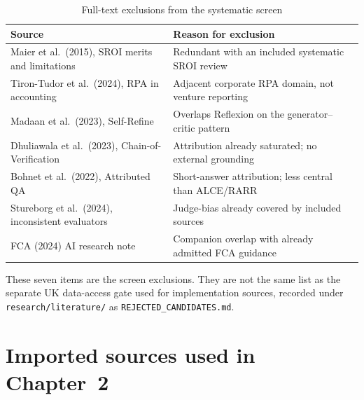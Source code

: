 \begin{table}[htbp]
  \centering
  \small
  \begin{tabularx}{\textwidth}{@{}P{0.46\textwidth}Y@{}}
    \toprule
    \textbf{Source} & \textbf{Reason for exclusion} \\
    \midrule
    Maier et al.\ (2015), SROI merits and limitations & Redundant with an included systematic SROI review \\
    Tiron-Tudor et al.\ (2024), RPA in accounting & Adjacent corporate RPA domain, not venture reporting \\
    Madaan et al.\ (2023), Self-Refine & Overlaps Reflexion on the generator--critic pattern \\
    Dhuliawala et al.\ (2023), Chain-of-Verification & Attribution already saturated; no external grounding \\
    Bohnet et al.\ (2022), Attributed QA & Short-answer attribution; less central than ALCE/RARR \\
    Stureborg et al.\ (2024), inconsistent evaluators & Judge-bias already covered by included sources \\
    FCA (2024) AI research note & Companion overlap with already admitted FCA guidance \\
    \bottomrule
  \end{tabularx}
  \caption{Full-text exclusions from the systematic screen}
  \label{tab:lit-screened-out}
\end{table}

These seven items are the screen exclusions. They are not the same list as the separate UK
data-access gate used for implementation sources, recorded under
\texttt{research/literature/} as \texttt{REJECTED\_CANDIDATES.md}.

\section*{Imported sources used in Chapter~2}

